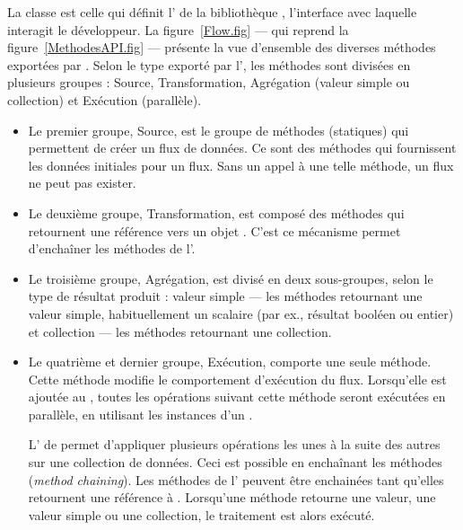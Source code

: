 La classe  est celle qui définit l' de la biblioth\`eque , l'interface avec laquelle interagit le d\'eveloppeur. La figure~\ref{Flow.fig} --- qui reprend la figure~\ref{MethodesAPI.fig} --- pr\'esente la vue d'ensemble des diverses m\'ethodes export\'ees par . Selon le type export\'e par l', les m\'ethodes sont divis\'ees en plusieurs groupes : Source, Transformation, Agr\'egation (valeur simple ou collection) et Ex\'ecution (parallèle).

\begin{itemize}

\item Le premier groupe, Source, est le groupe de méthodes (statiques) qui permettent de créer un flux de donn\'ees. Ce sont des m\'ethodes qui fournissent les donn\'ees initiales pour un flux. Sans un appel \`a une telle m\'ethode, un flux ne peut pas exister. 

\item Le deuxi\`eme groupe, Transformation, est composé des m\'ethodes qui retournent une r\'ef\'erence vers un objet . C'est ce m\'ecanisme permet d'encha\^iner les m\'ethodes de l'.

\item Le troisi\`eme groupe, Agr\'egation, est divis\'e en deux sous-groupes, selon le type de r\'esultat produit : valeur simple --- les m\'ethodes retournant une valeur simple, habituellement un scalaire (par ex., r\'esultat bool\'een ou entier) et collection --- les m\'ethodes retournant une collection.

\item Le quatrième et dernier groupe, Exécution, comporte une seule m\'ethode. Cette m\'ethode modifie le comportement d'ex\'ecution du flux. Lorsqu'elle est ajout\'ee au  , toutes les op\'erations suivant cette m\'ethode seront ex\'ecut\'ees en parall\`ele, en utilisant les instances d'un  .

L' de  permet d'appliquer plusieurs op\'erations les unes à la suite des autres sur une collection de donn\'ees. Ceci est possible en encha\^inant les m\'ethodes (\emph{method chaining}). Les m\'ethodes de l' peuvent \^etre enchain\'ees tant qu'elles retournent une r\'ef\'erence \`a . Lorsqu'une m\'ethode retourne une valeur, une valeur simple ou une collection, le traitement est alors ex\'ecut\'e. 

\end{itemize}





